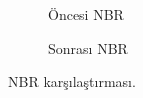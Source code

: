 \documentclass[11pt,a4paper]{article}
\begin{document}
\begin{figure}[H]
  \centering
  \begin{subfigure}[b]{0.48\textwidth}
    \centering
    \caption{Öncesi NBR}
  \end{subfigure}\hfill
  \begin{subfigure}[b]{0.48\textwidth}
    \centering
    \caption{Sonrası NBR}
  \end{subfigure}
  \caption{NBR karşılaştırması.}
\end{figure}
\FloatBarrier
\end{document}
